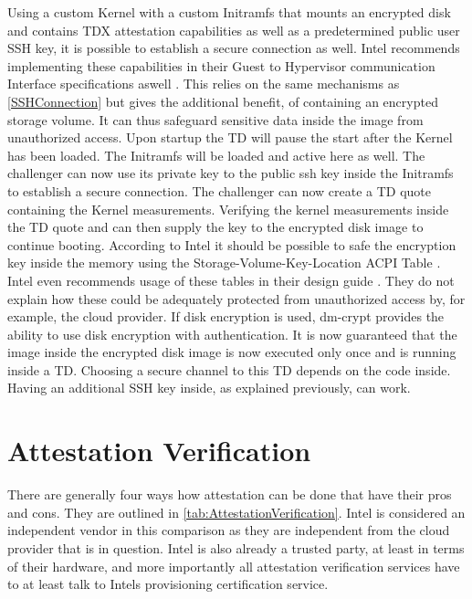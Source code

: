 Using a custom Kernel with a custom Initramfs that mounts an encrypted disk and contains \Gls{TDX} attestation capabilities as well as a predetermined public user SSH key, it is possible to establish a secure connection as well. Intel recommends implementing these capabilities in their Guest to Hypervisor communication Interface specifications aswell \cite{intel_corporation_guest_hypervisor}. This relies on the same mechanisms as \ref{SSHConnection} but gives the additional benefit, of containing an encrypted storage volume. It can thus safeguard sensitive data inside the image from unauthorized access. Upon startup the TD will pause the start after the Kernel has been loaded. The Initramfs will be loaded and active here as well. The challenger can now use its private key to the public ssh key inside the Initramfs to establish a secure connection. The challenger can now create a TD quote containing the Kernel measurements. Verifying the kernel measurements inside the TD quote and can then supply the key to the encrypted disk image to continue booting. According to Intel it should be possible to safe the encryption key inside the memory using the Storage-Volume-Key-Location ACPI Table \cite{intel_corporation_guest_hypervisor}. Intel even recommends usage of these tables in their design guide \cite{intel_corporation_guest_hypervisor}. They do not explain how these could be adequately protected from unauthorized access by, for example, the cloud provider. If disk encryption is used, dm-crypt provides the ability to use disk encryption with authentication. It is now guaranteed that the image inside the encrypted disk image is now executed only once and is running inside a TD. Choosing a secure channel to this TD depends on the code inside. Having an additional SSH key inside, as explained previously, can work.

\section{Attestation Verification}

There are generally four ways how attestation can be done that have their pros and cons. They are outlined in \cref{tab:AttestationVerification}. Intel is considered an independent vendor in this comparison as they are independent from the cloud provider that is in question. Intel is also already a trusted party, at least in terms of their hardware, and more importantly all attestation verification services have to at least talk to Intels provisioning certification service.

